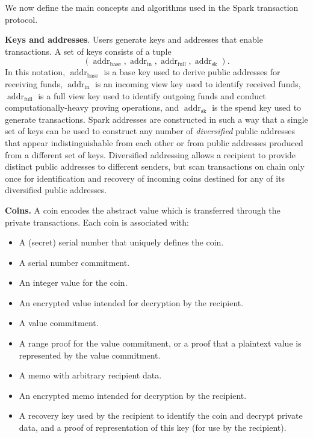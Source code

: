\documentclass{llncs}
\newcommand{\addr}{\operatorname{addr}}
\begin{document}
We now define the main concepts and algorithms used in the Spark transaction protocol.

\textbf{Keys and addresses}. Users generate keys and addresses that enable transactions.
A set of keys consists of a tuple $$(\addr_{\text{base}}, \addr_{\text{in}}, \addr_{\text{full}}, \addr_{\text{sk}}).$$
In this notation, $\addr_{\text{base}}$ is a base key used to derive public addresses for receiving funds, $\addr_{\text{in}}$ is an incoming view key used to identify received funds, $\addr_{\text{full}}$ is a full view key used to identify outgoing funds and conduct computationally-heavy proving operations, and $\addr_{\text{sk}}$ is the spend key used to generate transactions.
Spark addresses are constructed in such a way that a single set of keys can be used to construct any number of \textit{diversified} public addresses that appear indistinguishable from each other or from public addresses produced from a different set of keys.
Diversified addressing allows a recipient to provide distinct public addresses to different senders, but scan transactions on chain only once for identification and recovery of incoming coins destined for any of its diversified public addresses.

\textbf{Coins.} A coin encodes the abstract value which is transferred through the private transactions. Each coin is associated with:
\begin{itemize}
\item A (secret) serial number that uniquely defines the coin.
\item A serial number commitment.
\item An integer value for the coin.
\item An encrypted value intended for decryption by the recipient.
\item A value commitment.
\item A range proof for the value commitment, or a proof that a plaintext value is represented by the value commitment.
\item A memo with arbitrary recipient data.
\item An encrypted memo intended for decryption by the recipient.
\item A recovery key used by the recipient to identify the coin and decrypt private data, and a proof of representation of this key (for use by the recipient).
\end{itemize}
\end{document}
